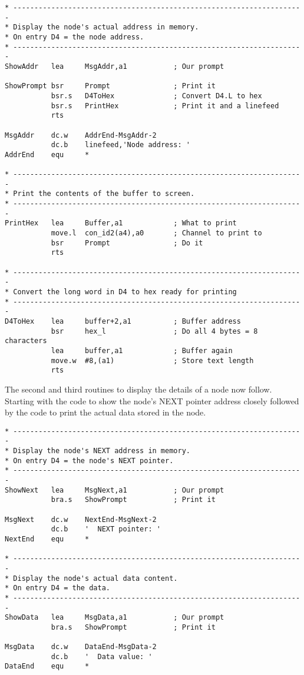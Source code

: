 \begin{lstlisting}[firstnumber=last,caption={Single Linked List - Demo Code - Show Addresses}]
* ---------------------------------------------------------------------
* Display the node's actual address in memory.
* On entry D4 = the node address.
* ---------------------------------------------------------------------
ShowAddr   lea     MsgAddr,a1           ; Our prompt

ShowPrompt bsr     Prompt               ; Print it
           bsr.s   D4ToHex              ; Convert D4.L to hex
           bsr.s   PrintHex             ; Print it and a linefeed
           rts

MsgAddr    dc.w    AddrEnd-MsgAddr-2
           dc.b    linefeed,'Node address: '
AddrEnd    equ     *

* ---------------------------------------------------------------------
* Print the contents of the buffer to screen.
* ---------------------------------------------------------------------
PrintHex   lea     Buffer,a1            ; What to print
           move.l  con_id2(a4),a0       ; Channel to print to
           bsr     Prompt               ; Do it
           rts

* ---------------------------------------------------------------------
* Convert the long word in D4 to hex ready for printing
* ---------------------------------------------------------------------
D4ToHex    lea     buffer+2,a1          ; Buffer address
           bsr     hex_l                ; Do all 4 bytes = 8 characters
           lea     buffer,a1            ; Buffer again
           move.w  #8,(a1)              ; Store text length
           rts
\end{lstlisting}

The second and third routines to display the details of a node now
    follow. Starting with the code to show the node's NEXT pointer address
    closely followed by the code to print the actual data stored in the
    node.

\begin{lstlisting}[firstnumber=last,caption={Single Linked List - Demo Code - Show Next Address}]
* ---------------------------------------------------------------------
* Display the node's NEXT address in memory.
* On entry D4 = the node's NEXT pointer.
* ---------------------------------------------------------------------
ShowNext   lea     MsgNext,a1           ; Our prompt
           bra.s   ShowPrompt           ; Print it

MsgNext    dc.w    NextEnd-MsgNext-2
           dc.b    '  NEXT pointer: '
NextEnd    equ     *

* ---------------------------------------------------------------------
* Display the node's actual data content.
* On entry D4 = the data.
* ---------------------------------------------------------------------
ShowData   lea     MsgData,a1           ; Our prompt
           bra.s   ShowPrompt           ; Print it

MsgData    dc.w    DataEnd-MsgData-2
           dc.b    '  Data value: '
DataEnd    equ     *
\end{lstlisting}

